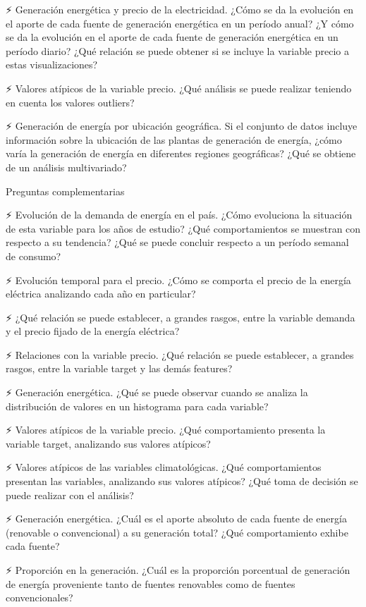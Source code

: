 \documentclass[11pt]{article}
\begin{document}
⚡ Generación energética y precio de la electricidad. ¿Cómo se da la
evolución en el aporte de cada fuente de generación energética en un
período anual? ¿Y cómo se da la evolución en el aporte de cada fuente de
generación energética en un período diario? ¿Qué relación se puede
obtener si se incluye la variable precio a estas visualizaciones?

⚡ Valores atípicos de la variable precio. ¿Qué análisis se puede
realizar teniendo en cuenta los valores outliers?

⚡ Generación de energía por ubicación geográfica. Si el conjunto de
datos incluye información sobre la ubicación de las plantas de
generación de energía, ¿cómo varía la generación de energía en
diferentes regiones geográficas? ¿Qué se obtiene de un análisis
multivariado?

Preguntas complementarias

⚡ Evolución de la demanda de energía en el país. ¿Cómo evoluciona la
situación de esta variable para los años de estudio? ¿Qué
comportamientos se muestran con respecto a su tendencia? ¿Qué se puede
concluir respecto a un período semanal de consumo?

⚡ Evolución temporal para el precio. ¿Cómo se comporta el precio de la
energía eléctrica analizando cada año en particular?

⚡ ¿Qué relación se puede establecer, a grandes rasgos, entre la
variable demanda y el precio fijado de la energía eléctrica?

⚡ Relaciones con la variable precio. ¿Qué relación se puede establecer,
a grandes rasgos, entre la variable target y las demás features?

⚡ Generación energética. ¿Qué se puede observar cuando se analiza la
distribución de valores en un histograma para cada variable?

⚡ Valores atípicos de la variable precio. ¿Qué comportamiento presenta
la variable target, analizando sus valores atípicos?

⚡ Valores atípicos de las variables climatológicas. ¿Qué
comportamientos presentan las variables, analizando sus valores
atípicos? ¿Qué toma de decisión se puede realizar con el análisis?

⚡ Generación energética. ¿Cuál es el aporte absoluto de cada fuente de
energía (renovable o convencional) a su generación total? ¿Qué
comportamiento exhibe cada fuente?

⚡ Proporción en la generación. ¿Cuál es la proporción porcentual de
generación de energía proveniente tanto de fuentes renovables como de
fuentes convencionales?
\end{document}
